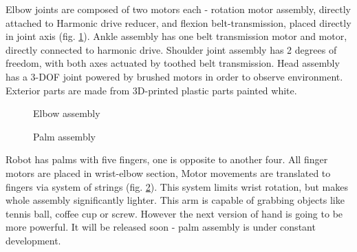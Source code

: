 \documentclass[letterpaper, 10 pt, conference]{ieeeconf}  %
\begin{document}
Elbow joints are composed of two motors each - rotation motor assembly, directly
attached to Harmonic drive reducer, and flexion belt-transmission, placed
directly in joint axis (fig. \ref{img:joints}).
Ankle assembly has one belt transmission motor and motor, directly connected
to harmonic drive.
Shoulder joint assembly has 2 degrees of freedom, with both axes actuated by
toothed belt transmission.
Head assembly has a 3-DOF joint powered by brushed
motors in order to observe environment.
Exterior parts are made from 3D-printed plastic parts painted white.

\begin{figure}[thpb]
\centering
{}
\caption{Elbow assembly}
\label{img:joints}
\end{figure}

\begin{figure}[thpb]
\centering
{}
\caption{Palm assembly}
\label{img:wrist}
\end{figure} 

Robot has palms with five fingers, one is opposite to another four. All
finger motors are placed in wrist-elbow section, Motor movements are
translated to fingers via system of strings (fig. \ref{img:wrist}). This system
limits wrist rotation, but makes whole assembly significantly lighter. This arm
is capable of grabbing objects like tennis ball, coffee cup or screw. However the next
version of hand is going to be more powerful. It will be released soon - palm
assembly is under constant development.
\end{document}
